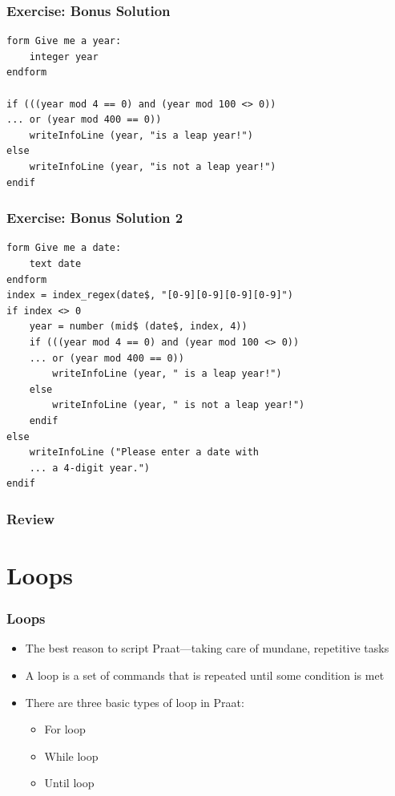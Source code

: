 \documentclass[handout]{beamer}
\begin{document}
\begin{frame}[fragile]
\frametitle{Exercise: Bonus Solution}

\begin{verbatim}
form Give me a year:
    integer year
endform

if (((year mod 4 == 0) and (year mod 100 <> 0))
... or (year mod 400 == 0))
    writeInfoLine (year, "is a leap year!")
else
    writeInfoLine (year, "is not a leap year!")
endif
\end{verbatim}
\end{frame}

\begin{frame}[fragile]
\frametitle{Exercise: Bonus Solution 2}

\begin{verbatim}
form Give me a date:
    text date
endform
index = index_regex(date$, "[0-9][0-9][0-9][0-9]")
if index <> 0
    year = number (mid$ (date$, index, 4))
    if (((year mod 4 == 0) and (year mod 100 <> 0))
    ... or (year mod 400 == 0))
        writeInfoLine (year, " is a leap year!")
    else
        writeInfoLine (year, " is not a leap year!")
    endif
else
    writeInfoLine ("Please enter a date with
    ... a 4-digit year.")
endif
\end{verbatim}
\end{frame}

\begin{frame}[fragile]
\frametitle{Review}


\end{frame}

\section{Loops}

\begin{frame}[fragile]
\frametitle{Loops}

\begin{itemize}
    \item <1-> The best reason to script Praat---taking care of mundane, repetitive tasks
    \item <1-> A loop is a set of commands that is repeated until some condition is met
    \item <1-> There are three basic types of loop in Praat:
    \begin{itemize}
        \item For loop
        \item While loop
        \item Until loop
    \end{itemize}
\end{itemize}  
\end{frame}
\end{document}
